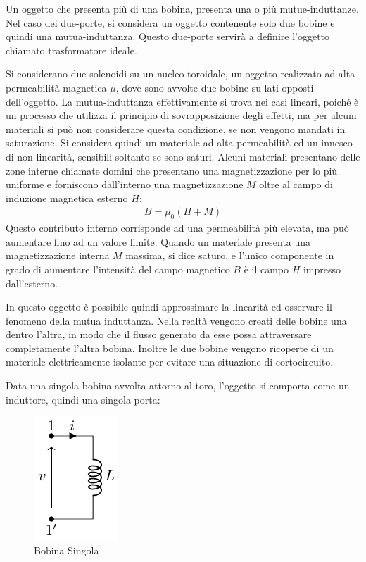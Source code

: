 \documentclass{article}
\numberwithin{equation}{subsection}
\begin{document}
Un oggetto che presenta più di una bobina, presenta una o più mutue-induttanze. Nel caso dei due-porte, si considera un oggetto contenente solo due bobine e quindi una 
mutua-induttanza. Questo due-porte servirà a definire l'oggetto chiamato trasformatore ideale. 



Si considerano due solenoidi su un nucleo toroidale, un oggetto realizzato ad alta permeabilità magnetica $\mu$, dove sono avvolte due bobine su lati opposti dell'oggetto. 
La mutua-induttanza effettivamente si trova nei casi lineari, 
poiché è un processo che utilizza il principio di sovrapposizione degli effetti, ma per alcuni materiali si può non considerare questa condizione, se non vengono mandati 
in saturazione. Si considera quindi un materiale ad alta permeabilità ed un innesco di non linearità, sensibili soltanto se sono saturi. 
Alcuni materiali presentano delle zone interne chiamate domini che presentano una magnetizzazione per lo più uniforme e forniscono dall'interno una magnetizzazione $M$ oltre 
al campo di induzione magnetica esterno $H$:
\begin{gather*}
    B=\mu_0(H+M)
\end{gather*}
Questo contributo interno corrisponde ad una permeabilità più elevata, ma può aumentare fino ad un valore limite. Quando un materiale presenta una magnetizzazione interna 
$M$ massima, si dice saturo, e l'unico componente in grado di aumentare l'intensità del campo magnetico $B$ è il campo $H$ impresso dall'esterno.  

In questo oggetto è possibile quindi approssimare la linearità ed osservare il fenomeno della mutua induttanza. Nella realtà vengono creati delle bobine una dentro l'altra, 
in modo che il flusso generato da esse possa attraversare completamente l'altra bobina. Inoltre le due bobine vengono ricoperte di un materiale elettricamente isolante per 
evitare una situazione di cortocircuito. 

Data una singola bobina avvolta attorno al toro, l'oggetto si comporta come un induttore, quindi una singola porta:
\begin{figure}[ht]%
    \centering
    \includegraphics{bobina-singola.pdf}
    \caption{Bobina Singola}
    \label{fig:bobina-singola}
\end{figure}
\end{document}
